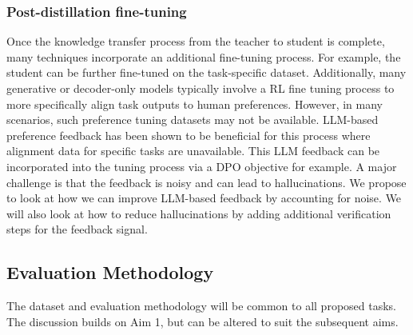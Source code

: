 \subsubsection{Post-distillation fine-tuning}

Once the knowledge transfer process from the teacher to student is complete, many techniques incorporate an additional fine-tuning process. For example, the student can be further fine-tuned on the task-specific dataset. Additionally, many generative or decoder-only models typically involve a RL fine tuning process to more specifically align task outputs to human preferences. However, in many scenarios, such preference tuning datasets may not be available. LLM-based preference feedback has been shown to be beneficial for this process where alignment data for specific tasks are unavailable. This LLM feedback can be incorporated into the tuning process via a DPO objective for example. A major challenge is that the feedback is noisy and can lead to hallucinations. We propose to look at how we can improve LLM-based feedback by accounting for noise. We will also look at how to reduce hallucinations by adding additional verification steps for the feedback signal. 

\subsection{Evaluation Methodology}
The dataset and evaluation methodology will be common to all proposed tasks. The discussion builds on Aim 1, but can be altered to suit the subsequent aims.

